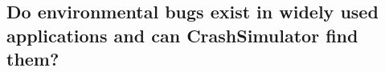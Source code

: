 %
%
%
%


\subsection{Do environmental bugs  exist in widely used applications and can
  CrashSimulator find them?}
\label{sec-env-bugs}

